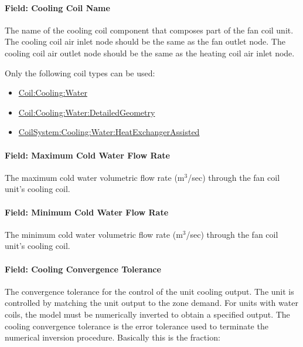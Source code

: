 \paragraph{Field: Cooling Coil Name}\label{field-cooling-coil-name-003}

The name of the cooling coil component that composes part of the fan coil unit. The cooling coil air inlet node should be the same as the fan outlet node. The cooling coil air outlet node should be the same as the heating coil air inlet node.

Only the following coil types can be used:

\begin{itemize}
\item
  \hyperref[coilcoolingwater]{Coil:Cooling:Water}
\item
  \hyperref[coilcoolingwaterdetailedgeometry]{Coil:Cooling:Water:DetailedGeometry}
\item
  \hyperref[coilsystemcoolingwaterheatexchangerassisted]{CoilSystem:Cooling:Water:HeatExchangerAssisted}
\end{itemize}

\paragraph{Field: Maximum Cold Water Flow Rate}\label{field-maximum-cold-water-flow-rate-000}

The maximum cold water volumetric flow rate (m\(^{3}\)/sec) through the fan coil unit's cooling coil.

\paragraph{Field: Minimum Cold Water Flow Rate}\label{field-minimum-cold-water-flow-rate-000}

The minimum cold water volumetric flow rate (m\(^{3}\)/sec) through the fan coil unit's cooling coil.

\paragraph{Field: Cooling Convergence Tolerance}\label{field-cooling-convergence-tolerance-000}

The convergence tolerance for the control of the unit cooling output. The unit is controlled by matching the unit output to the zone demand. For units with water coils, the model must be numerically inverted to obtain a specified output. The cooling convergence tolerance is the error tolerance used to terminate the numerical inversion procedure. Basically this is the fraction:


